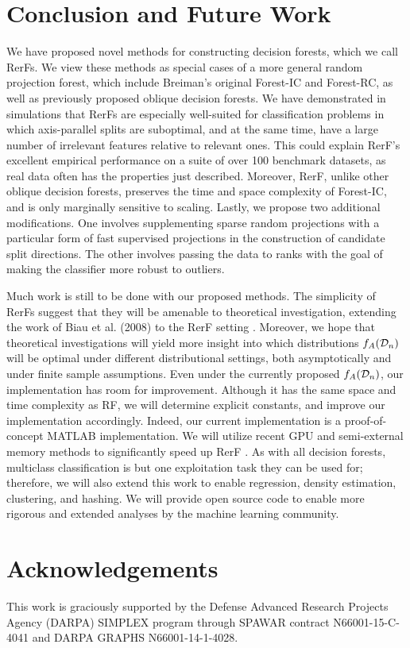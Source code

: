 \documentclass[10pt]{article}
\begin{document}
\section{Conclusion and Future Work}

We have proposed novel methods for constructing decision forests, which we call RerFs. We view these methods as special cases of a more general random projection forest, which include Breiman's original Forest-IC and Forest-RC, as well as previously proposed oblique decision forests. We have demonstrated in simulations that RerFs are especially well-suited for classification problems in which axis-parallel splits are suboptimal, and at the same time, have a large number of irrelevant features relative to relevant ones. This could explain RerF's excellent empirical performance on a suite of over 100 benchmark datasets, as real data often has the properties just described. Moreover, RerF, unlike other oblique decision forests, preserves the time and space complexity of Forest-IC, and is only marginally sensitive to scaling. Lastly, we propose two additional modifications. One involves supplementing sparse random projections with a particular form of fast supervised projections in the construction of candidate split directions. The other involves passing the data to ranks with the goal of making the classifier more robust to outliers.

Much work is still to be done with our proposed methods. The simplicity of RerFs suggest that they will be amenable to theoretical investigation, extending the work of Biau et al. (2008) to the RerF setting \cite{biau2008}. Moreover, we hope that theoretical investigations will yield more insight into which distributions $f_A(\mathcal{D}_n)$ will be optimal under different distributional settings, both asymptotically and under finite sample assumptions. Even under the currently proposed $f_A(\mathcal{D}_n)$, our implementation has room for improvement. Although it has the same space and time complexity as RF, we will determine explicit constants, and improve our implementation accordingly. Indeed, our current implementation is a proof-of-concept MATLAB implementation. We will utilize recent GPU and semi-external memory methods to significantly speed up RerF \cite{zheng15flashgraph}. As with all decision forests, multiclass classification is but one exploitation task they can be used for; therefore, we will also extend this work to enable regression, density estimation, clustering, and hashing. We will provide open source code to enable more rigorous and extended analyses by the machine learning community.

\section*{Acknowledgements}

This work is graciously supported by the Defense Advanced Research Projects Agency (DARPA) SIMPLEX program through SPAWAR contract N66001-15-C-4041 and DARPA GRAPHS N66001-14-1-4028.



\end{document}
